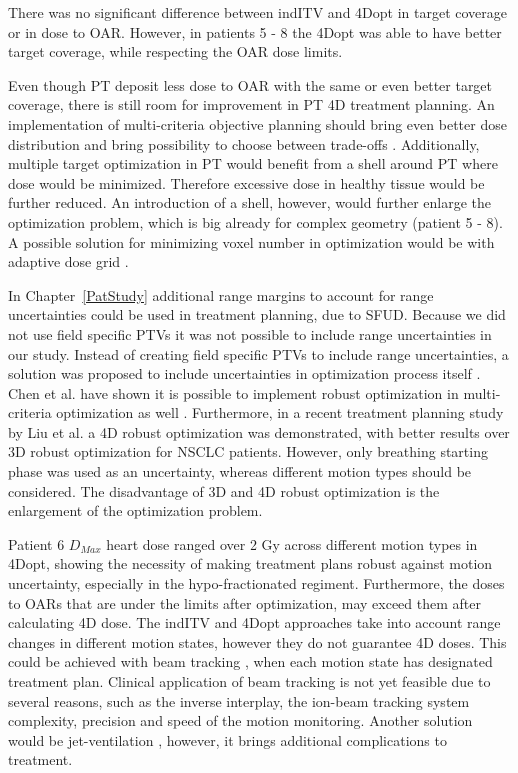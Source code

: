 There was no significant difference between indITV and 4Dopt in target coverage or in dose to OAR. 
However, in patients 5 - 8 the 4Dopt was able to have better target coverage, while respecting the OAR dose limits.

Even though PT deposit less dose to OAR with the same or even better target coverage, there is still room for improvement in PT 4D treatment planning. 
An implementation of multi-criteria objective planning should bring even better dose distribution and bring possibility to choose between trade-offs \cite{Breedveld2007, Chen2010}. 
Additionally, multiple target optimization in PT would benefit from a shell around PT where dose would be minimized. Therefore excessive dose
in healthy tissue would be further reduced. An introduction of a shell, however, would further enlarge the optimization problem, which is big already for complex geometry (patient 5 - 8). 
A possible solution for minimizing voxel number in optimization would be with adaptive dose grid \cite{Prall2016a}.

In Chapter~\ref{PatStudy} additional range margins to account for range uncertainties could be used in treatment planning, due to SFUD. 
Because we did not use field specific PTVs it was not possible to include range uncertainties in our study.
Instead of creating field specific PTVs to include range uncertainties, a solution was proposed to include uncertainties in optimization process itself \cite{Pflugfelder2008, Unkelbach2009, Fredriksson2011, Chen2012}.
Chen et al. have shown it is possible to implement robust optimization in multi-criteria optimization as well \cite{Chen2012}. Furthermore, in a recent treatment planning study by Liu et al. \cite{Liu2016}
a 4D robust optimization was demonstrated, with better results over 3D robust optimization for NSCLC patients. However, only breathing starting phase was used as an uncertainty,
whereas different motion types should be considered. The disadvantage of 3D and 4D robust optimization is the enlargement of the optimization problem.

Patient 6 $D_{Max}$ heart dose ranged over 2 Gy across different motion types in 4Dopt, showing the necessity of making treatment plans robust against motion uncertainty, 
especially in the hypo-fractionated regiment. Furthermore, the doses to OARs that are under the limits after optimization, may exceed them after calculating 4D dose. 
The indITV and 4Dopt approaches take into account range changes in different motion states, however they do not guarantee 4D doses. This could be achieved with beam tracking \cite{Bert2007}, 
when each motion state has designated treatment plan. Clinical application of beam tracking is not yet feasible due to several reasons, such as the 
inverse interplay, the ion-beam tracking system complexity, precision and speed of the motion monitoring.
Another solution would be jet-ventilation \cite{Santiago2013}, however, it brings additional complications to treatment.

